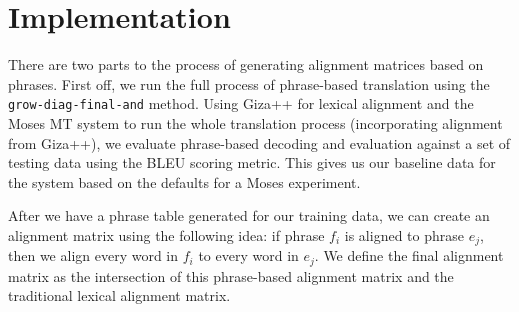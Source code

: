 \documentclass[twocolumn]{article}
\newcommand{\originalAlign}{\texttt{grow-diag-final-and}}
\begin{document}
\section{Implementation}
There are two parts to the process of generating alignment matrices based on
phrases. First off, we run the full process of phrase-based translation using
the \originalAlign{} method. Using Giza++ for lexical alignment and the Moses MT
system to run the whole translation process (incorporating alignment from
Giza++), we evaluate phrase-based decoding and evaluation against a set of
testing data using the BLEU scoring metric. This gives us our baseline data for
the system based on the defaults for a Moses experiment.

After we have a phrase table generated for our training data, we can create an
alignment matrix using the following idea: if phrase $f_i$ is aligned to phrase
$e_j$, then we align every word in $f_i$ to every word in $e_j$. We define the
final alignment matrix as the intersection of this phrase-based alignment matrix
and the traditional lexical alignment matrix.


\end{document}
